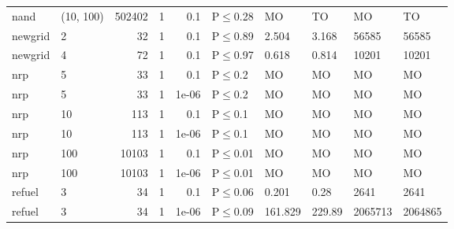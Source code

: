 \begin{longtable}{llrrrlllll}
 nand          & (10, 100) & 	502402 & 1 & 0.1   & P$\leq$0.28  & MO      & TO      & MO      & TO      \\
 newgrid       & 2         &     	32 & 1 & 0.1   & P$\leq$0.89  & 2.504   & 3.168   & 56585   & 56585   \\
 newgrid       & 4         &     	72 & 1 & 0.1   & P$\leq$0.97  & 0.618   & 0.814   & 10201   & 10201   \\
 nrp           & 5         &     	33 & 1 & 0.1   & P$\leq$0.2   & MO      & MO      & MO      & MO      \\
 nrp           & 5         &     	33 & 1 & 1e-06 & P$\leq$0.2   & MO      & MO      & MO      & MO      \\
 nrp           & 10        &    	113 & 1 & 0.1   & P$\leq$0.1   & MO      & MO      & MO      & MO      \\
 nrp           & 10        &    	113 & 1 & 1e-06 & P$\leq$0.1   & MO      & MO      & MO      & MO      \\
 nrp           & 100       &  	10103 & 1 & 0.1   & P$\leq$0.01  & MO      & MO      & MO      & MO      \\
 nrp           & 100       &  	10103 & 1 & 1e-06 & P$\leq$0.01  & MO      & MO      & MO      & MO      \\
 refuel        & 3         &     	34 & 1 & 0.1   & P$\leq$0.06  & 0.201   & 0.28    & 2641    & 2641    \\
 refuel        & 3         &     	34 & 1 & 1e-06 & P$\leq$0.09  & 161.829 & 229.89  & 2065713 & 2064865 \\
\bottomrule
\end{longtable}
